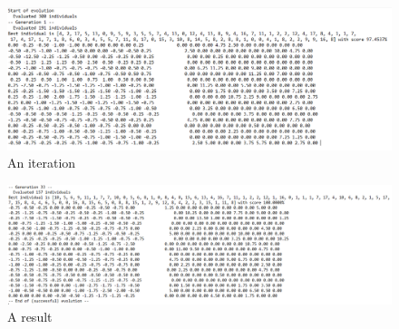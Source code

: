 \documentclass{beamer}
\begin{document}
\begin{frame}
\begin{figure}[H]
    \centering
    \includegraphics[width=1\textwidth]{fig/results1}
    \caption{An iteration}
    \label{fig:results1}
\end{figure}
\end{frame}

\begin{frame}
\begin{figure}[H]
    \centering
    \includegraphics[width=1\textwidth]{fig/results3}
    \caption{A result}
    \label{fig:results3}
\end{figure}
\end{frame}

\begin{frame}
\end{frame}
\end{document}
